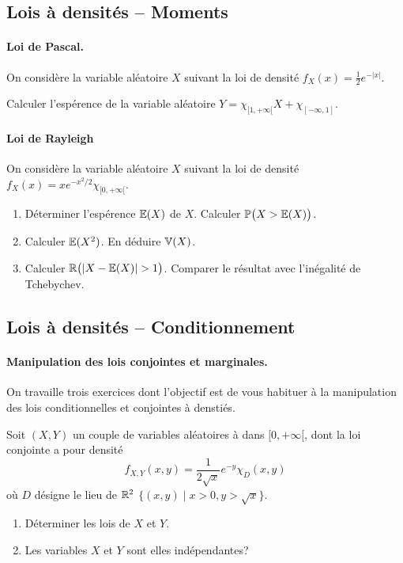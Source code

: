 \documentclass[11pt, a4paper]{article}
\begin{document}
\subsection{Lois à densités -- Moments}

\paragraph{Loi de Pascal.}
On considère la variable aléatoire $X$ suivant la loi de densité
$f_X(x) =  \frac{1}{2}e^{-|x|}$.
\begin{question}
  Calculer l'espérence de la variable aléatoire
  $Y = \chi_{[1, +\infty[}X + \chi_{[-\infty, 1]}$.
\end{question}

\paragraph{Loi de Rayleigh}
On considère la variable aléatoire $X$ suivant la loi de densité
$f_X(x) = xe^{-x^2/2}\chi_{[0, +\infty[}$.
\begin{question}
  \begin{enumerate}
  \item Déterminer l'espérence $\mathbb{E}(X)$ de $X$. Calculer
    $\mathbb{P}\big(X > \mathbb{E}(X)\big)$.
  \item Calculer $\mathbb{E}(X^2)$. En déduire $\mathbb{V}(X)$.
  \item Calculer $\mathbb{R}\big(|X-\mathbb{E}(X)| > 1\big)$. Comparer le
    résultat avec l'inégalité de Tchebychev.
  \end{enumerate}
\end{question}

\subsection{Lois à densités -- Conditionnement}

\paragraph{Manipulation des lois conjointes et marginales.} On
travaille trois exercices dont l'objectif est de vous habituer à la
manipulation des lois conditionnelles et conjointes à denstiés.

\begin{question}
  Soit $(X, Y)$ un couple de variables aléatoires à dans
  $[0, +\infty[$, dont la loi conjointe a pour densité
  \[ f_{X, Y}(x, y) = \frac{1}{2\sqrt{x}}e^{-y}\chi_D(x, y)
  \]
  où $D$ désigne le lieu de $\mathbb{R}^2$
  $\{(x, y) \mid x > 0, y > \sqrt{x}\}$.
  \begin{enumerate}
  \item Déterminer les lois de $X$ et $Y$.
  \item Les variables $X$ et $Y$ sont elles indépendantes?
  \end{enumerate}
\end{question}
\end{document}
